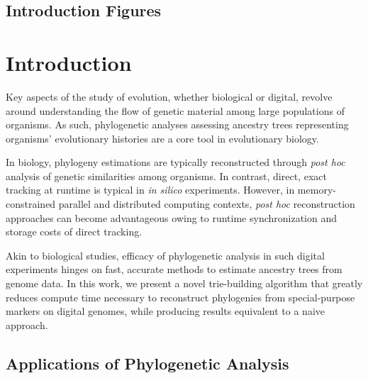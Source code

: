 \subsection{Introduction Figures}

\FloatBarrier









\section{Introduction} \label{sec:introduction}

Key aspects of the study of evolution, whether biological or digital, revolve around understanding the flow of genetic material among large populations of organisms.
As such, phylogenetic analyses assessing ancestry trees representing organisms' evolutionary histories are a core tool in evolutionary biology.

In biology, phylogeny estimations are typically reconstructed through \textit{post hoc} analysis of genetic similarities among organisms.
In contrast, direct, exact tracking at runtime is typical in \textit{in silico} experiments.
However, in memory-constrained parallel and distributed computing contexts, \textit{post hoc} reconstruction approaches can become advantageous owing to runtime synchronization and storage costs of direct tracking.

Akin to biological studies, efficacy of phylogenetic analysis in such digital experiments hinges on fast, accurate methods to estimate ancestry trees from genome data.
In this work, we present a novel trie-building algorithm that greatly reduces compute time necessary to reconstruct phylogenies from special-purpose markers on digital genomes, while producing results equivalent to a naive approach.

\subsection{Applications of Phylogenetic Analysis}

